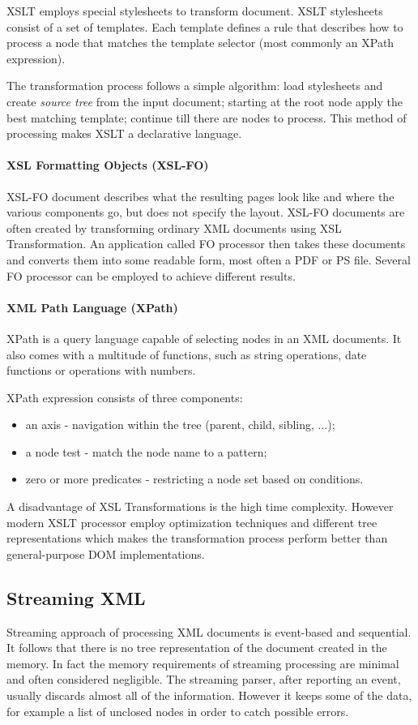 \documentclass[11pt,oneside,final]{fithesis2}
\begin{document}
XSLT employs special stylesheets to transform document. XSLT stylesheets consist of a set of templates. Each template defines a rule that describes how to process a node that matches the template selector (most commonly an XPath expression). 

The transformation process follows a simple algorithm: load stylesheets and create \textit{source tree} from the input document; starting at the root node apply the best matching template; continue till there are nodes to process. This method of processing makes XSLT a declarative language.

\paragraph*{XSL Formatting Objects (XSL-FO)}
\label{xsl:xsl-fo}
XSL-FO document describes what the resulting pages look like and where the various components go, but does not specify the layout. XSL-FO documents are often created by transforming ordinary XML documents using XSL Transformation. An application called FO processor then takes these documents and converts them into some readable form, most often a PDF or PS file. Several FO processor can be employed to achieve different results.

\paragraph*{XML Path Language (XPath)}
\label{xsl:xpath}
XPath is a query language capable of selecting nodes in an XML documents. It also comes with a multitude of functions, such as string operations, date functions or operations with numbers. 

XPath expression consists of three components: 
\begin{itemize}
\item an axis - navigation within the tree (parent, child, sibling, $\ldots$);
\item a node test - match the node name to a pattern;
\item zero or more predicates - restricting a node set based on conditions.
\end{itemize}

A disadvantage of XSL Transformations is the high time complexity. However modern XSLT processor employ optimization techniques and different tree representations which makes the transformation process perform better than general-purpose DOM implementations.

\subsection{Streaming XML}
Streaming approach of processing XML documents is event-based and sequential. It follows that there is no tree representation of the document created in the memory. In fact the memory requirements of streaming processing are minimal and often considered negligible. The streaming parser, after reporting an event, usually discards almost all of the information. However it keeps some of the data, for example a list of unclosed nodes in order to catch possible errors. 
\end{document}
